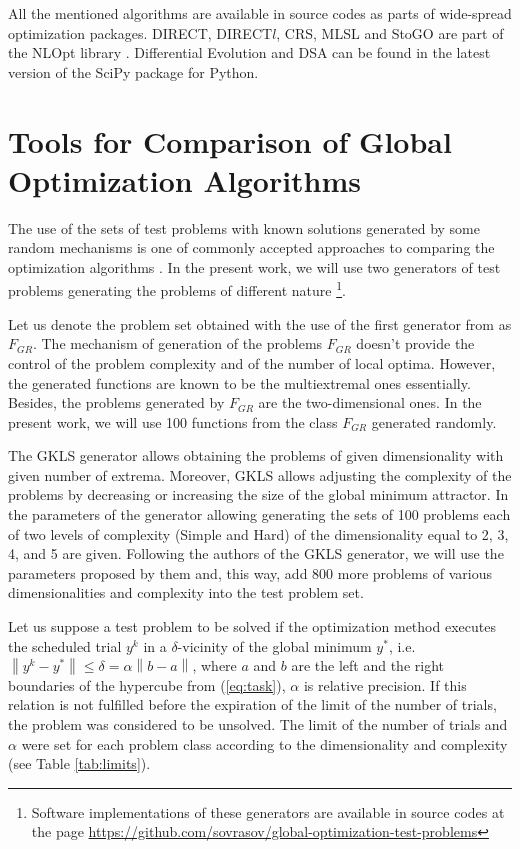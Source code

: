 All the mentioned algorithms are available in source codes as parts of wide-spread optimization packages.
DIRECT, DIRECT$l$, CRS, MLSL and StoGO are part of the NLOpt library \cite{nlopt}.
Differential Evolution and DSA can be found in
the latest version of the SciPy \cite{scipy} package for Python.

\section{Tools for Comparison of Global Optimization Algorithms}

The use of the sets of test problems with known solutions generated by some random mechanisms is
one of commonly accepted approaches to comparing the optimization algorithms
\cite{Beiranvand2017}. In the present work, we will use two generators of test problems generating
the problems of different nature \cite{grishaginClass, Gaviano2003} \footnote{Software implementations of
these generators are available in source codes at the page \url{https://github.com/sovrasov/global-optimization-test-problems}}.

Let us denote the problem set obtained with the use of the first generator from \cite{grishaginClass}
as \(F_{GR}\). The mechanism of generation of the problems \(F_{GR}\) doesn't provide the
control of the problem complexity and of the number of local optima. However, the generated
functions are known to be the multiextremal ones essentially. Besides, the problems generated by
\(F_{GR}\) are the two-dimensional ones. In the present work, we will use 100 functions from the
class \(F_{GR}\) generated randomly.

The GKLS generator \cite{Gaviano2003} allows obtaining the problems of given dimensionality
with given number of extrema. Moreover, GKLS allows adjusting the complexity of the problems by
decreasing or increasing the size of the global minimum attractor. In
\cite{SergeyevKvasov2006} the parameters of the generator allowing generating the sets of 100
problems each of two levels of complexity (Simple and Hard) of the dimensionality equal to 2, 3, 4,
and 5 are given. Following the authors of the GKLS generator, we will use the parameters proposed
by them and, this way, add 800 more problems of various dimensionalities and complexity into the
test problem set.

Let us suppose a test problem to be solved if the optimization method executes the scheduled trial
\(y^k\) in a \(\delta\)-vicinity of the global minimum \(y^*\), i.e. $\left\|y^k-y^*\right\|\leq \delta
= \alpha\left\|b-a\right\|$, where \(a\) and \(b\) are the left and the right boundaries of the hypercube
from (\ref{eq:task}), $\alpha$ is relative precision. If this relation is not fulfilled before the expiration of the limit of the number of
trials, the problem was considered to be unsolved. The limit of the number of trials and $\alpha$ were set
for each problem class according to the dimensionality and complexity (see Table \ref{tab:limits}).

